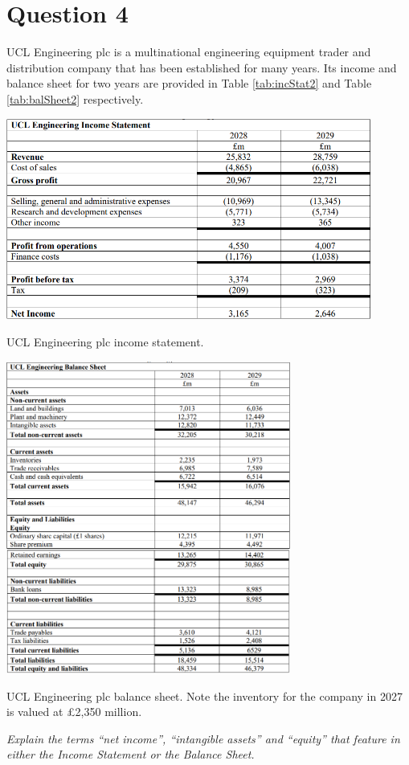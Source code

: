 \section{Question 4}
UCL Engineering plc is a multinational engineering equipment trader and distribution company that has been established for many years. Its income and balance sheet for two years are provided in Table \ref{tab:incStat2} and Table \ref{tab:balSheet2} respectively.
\begin{table}[H]
    \centering
    \includegraphics[width = 0.9\textwidth]{img/figure69.png}
    \caption{UCL Engineering plc income statement.}
    \label{tab:incStat2}
\end{table}
\begin{table}[H]
    \centering
    \includegraphics[width = 0.7\textwidth]{img/figure70.png}
    \caption{UCL Engineering plc balance sheet.  Note the inventory for the company in 2027 is valued at \pounds 2,350 million.}
    \label{tab:balSheet2}
\end{table}
\textit{Explain the terms ``net income'', ``intangible assets'' and ``equity'' that feature in either the Income Statement or the Balance Sheet.}

